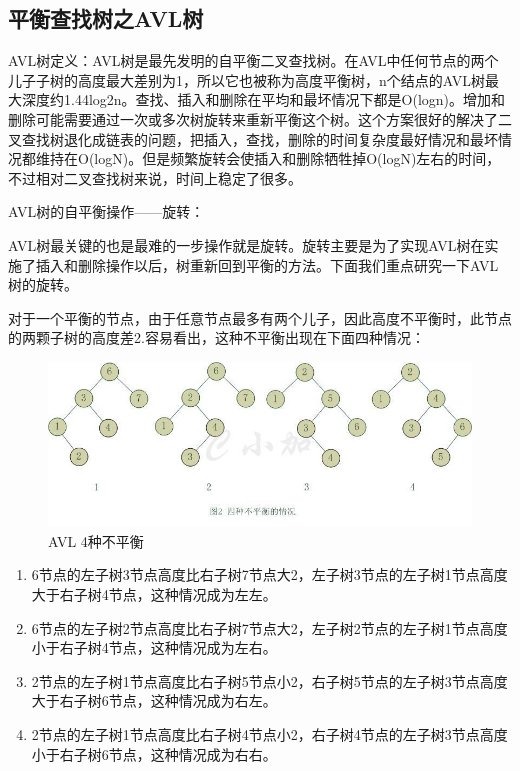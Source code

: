 \documentclass[UTF8,a4paper,12pt]{ctexbook}
\begin{document}
			\subsection{平衡查找树之AVL树}
				AVL树定义：AVL树是最先发明的自平衡二叉查找树。在AVL中任何节点的两个儿子子树的高度最大差别为1，所以它也被称为高度平衡树，n个结点的AVL树最大深度约1.44log2n。查找、插入和删除在平均和最坏情况下都是O(logn)。增加和删除可能需要通过一次或多次树旋转来重新平衡这个树。这个方案很好的解决了二叉查找树退化成链表的问题，把插入，查找，删除的时间复杂度最好情况和最坏情况都维持在O(logN)。但是频繁旋转会使插入和删除牺牲掉O(logN)左右的时间，不过相对二叉查找树来说，时间上稳定了很多。
				
				AVL树的自平衡操作——旋转：
				
				AVL树最关键的也是最难的一步操作就是旋转。旋转主要是为了实现AVL树在实施了插入和删除操作以后，树重新回到平衡的方法。下面我们重点研究一下AVL树的旋转。
				
				对于一个平衡的节点，由于任意节点最多有两个儿子，因此高度不平衡时，此节点的两颗子树的高度差2.容易看出，这种不平衡出现在下面四种情况：
				\begin{figure}[H]
					\centering
					\includegraphics[scale = 0.8]{AVL.jpg}
					\caption{AVL 4种不平衡}
					\label{AVL}
				\end{figure}
					
				\begin{enumerate}[itemindent = 1em,label = (\arabic{enumi})]
					\item  6节点的左子树3节点高度比右子树7节点大2，左子树3节点的左子树1节点高度大于右子树4节点，这种情况成为左左。
					\item  6节点的左子树2节点高度比右子树7节点大2，左子树2节点的左子树1节点高度小于右子树4节点，这种情况成为左右。
					\item  2节点的左子树1节点高度比右子树5节点小2，右子树5节点的左子树3节点高度大于右子树6节点，这种情况成为右左。
					\item  2节点的左子树1节点高度比右子树4节点小2，右子树4节点的左子树3节点高度小于右子树6节点，这种情况成为右右。
				\end{enumerate}
				
\end{document}
